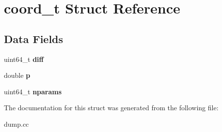 \hypertarget{structcoord__t}{\section{coord\-\_\-t \-Struct \-Reference}
\label{structcoord__t}
}
\subsection*{\-Data \-Fields}
\begin{DoxyCompactItemize}
\item 
\hypertarget{structcoord__t_ad41e6a8d8451b24a372b84fdf22a3d22}{uint64\-\_\-t {\bfseries diff}}\label{structcoord__t_ad41e6a8d8451b24a372b84fdf22a3d22}

\item 
\hypertarget{structcoord__t_a1e6001a90db605d436078588ffe86954}{double {\bfseries p}}\label{structcoord__t_a1e6001a90db605d436078588ffe86954}

\item 
\hypertarget{structcoord__t_a2bbbbb017a72171741710829602a1b07}{uint64\-\_\-t {\bfseries nparams}}\label{structcoord__t_a2bbbbb017a72171741710829602a1b07}

\end{DoxyCompactItemize}


\-The documentation for this struct was generated from the following file\-:\begin{DoxyCompactItemize}
\item 
dump.\-cc\end{DoxyCompactItemize}
